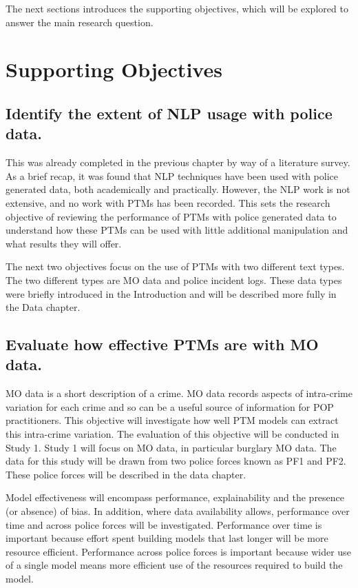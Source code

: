 The next sections introduces the supporting objectives, which will be explored to answer the main research question.
 
\section{Supporting Objectives} 

\subsection{Identify the extent of NLP usage with police data.}  This was already completed in the previous chapter by way of a literature survey. As a brief recap, it was found that NLP techniques have been used with police generated data, both academically and practically. However, the NLP work is not extensive, and no work with PTMs has been recorded. This sets the research objective of reviewing the performance of PTMs with police generated data to understand how these PTMs can be used with little additional manipulation and what results they will offer.

The next two objectives focus on the use of PTMs with two different text types. The two different types are MO data and police incident logs. These data types were briefly introduced in the Introduction and will be described more fully in the Data chapter.


\subsection{Evaluate how effective PTMs are with MO data.} MO data is a short description of a crime. MO data records aspects of intra-crime variation for each crime and so can be a useful source of information for POP practitioners. This objective will investigate how well PTM models can extract this intra-crime variation. The evaluation of this objective will be conducted in Study 1. Study 1 will focus on MO data, in particular burglary MO data. The data for this study will be drawn from two police forces known as PF1 and PF2. These police forces will be described in the data chapter.

 Model effectiveness will encompass performance, explainability and the presence (or absence) of bias. In addition, where data availability allows, performance over time and across police forces will be investigated. Performance over time is important because effort spent building models that last longer will be more resource efficient. Performance across police forces is important because wider use of a single model means more efficient use of the resources required to build the model.

